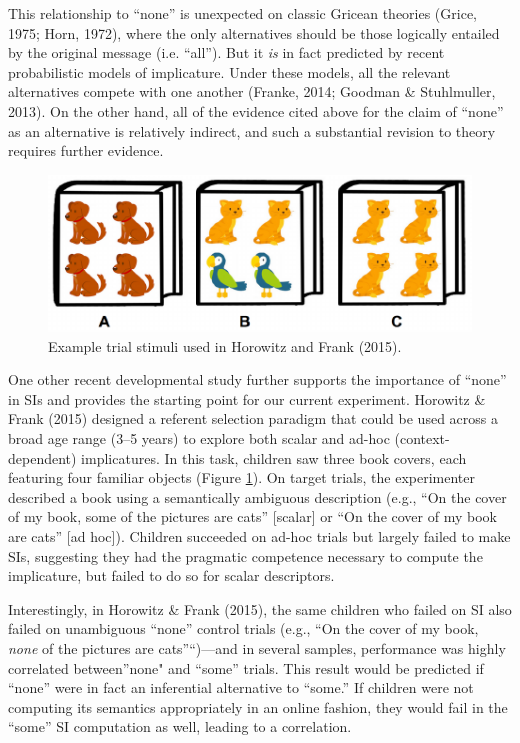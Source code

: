 \documentclass[10pt, letterpaper]{article}
\newenvironment{CodeChunk}{}{}
\begin{document}
This relationship to ``none'' is unexpected on classic Gricean theories
(Grice, 1975; Horn, 1972), where the only alternatives should be those
logically entailed by the original message (i.e. ``all''). But it
\emph{is} in fact predicted by recent probabilistic models of
implicature. Under these models, all the relevant alternatives compete
with one another (Franke, 2014; Goodman \& Stuhlmuller, 2013). On the
other hand, all of the evidence cited above for the claim of ``none'' as
an alternative is relatively indirect, and such a substantial revision
to theory requires further evidence.

\begin{CodeChunk}
\begin{figure}[b]

{\centering \includegraphics{figs/image-1} 

}

\caption[Example trial stimuli used in Horowitz and Frank (2015)]{Example trial stimuli used in Horowitz and Frank (2015).}\label{fig:image}
\end{figure}
\end{CodeChunk}

One other recent developmental study further supports the importance of
``none'' in SIs and provides the starting point for our current
experiment. Horowitz \& Frank (2015) designed a referent selection
paradigm that could be used across a broad age range (3--5 years) to
explore both scalar and ad-hoc (context-dependent) implicatures. In this
task, children saw three book covers, each featuring four familiar
objects (Figure \ref{fig:image}). On target trials, the experimenter
described a book using a semantically ambiguous description (e.g., ``On
the cover of my book, some of the pictures are cats'' {[}scalar{]} or
``On the cover of my book are cats'' {[}ad hoc{]}). Children succeeded
on ad-hoc trials but largely failed to make SIs, suggesting they had the
pragmatic competence necessary to compute the implicature, but failed to
do so for scalar descriptors.

Interestingly, in Horowitz \& Frank (2015), the same children who failed
on SI also failed on unambiguous ``none'' control trials (e.g., ``On the
cover of my book, \emph{none} of the pictures are cats''``)---and in
several samples, performance was highly correlated between''none" and
``some'' trials. This result would be predicted if ``none'' were in fact
an inferential alternative to ``some.'' If children were not computing
its semantics appropriately in an online fashion, they would fail in the
``some'' SI computation as well, leading to a correlation.
\end{document}
